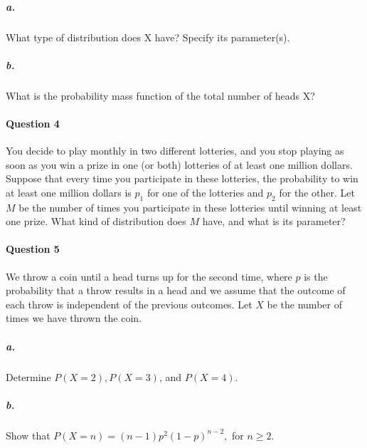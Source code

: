 \documentclass[11pt]{article} %
\begin{document}
\subparagraph*{a.} What type of distribution does X have? Specify its parameter(s). 
\subparagraph*{b.} What is the probability mass function of the total number of heads X?

\paragraph*{\bf Question 4}
You decide to play monthly in two different lotteries, and you stop playing as soon as you win a prize in one (or both) lotteries of
at least one million dollars. Suppose that every time you participate in these lotteries, the probability to win at least one million dollars is $p_1$ for one of the lotteries and $p_2$ for the other. Let $M$ be the number of times you participate in these lotteries until winning at least one prize. What kind of distribution does $M$ have, and what is its parameter?

\paragraph*{\bf Question 5}
We throw a coin until a head turns up for the second time, where $p$ is the probability that a throw results in a head and we assume
that the outcome of each throw is independent of the previous outcomes. Let $X$ be the number of times we have thrown the coin.
\subparagraph*{a.} Determine $P(X = 2), P(X = 3)$, and $P(X = 4)$.
\subparagraph*{b.} Show that $P(X = n) = (n - 1)p^2(1-p)^{n-2},$ for $n \ge 2.$
\end{document}
